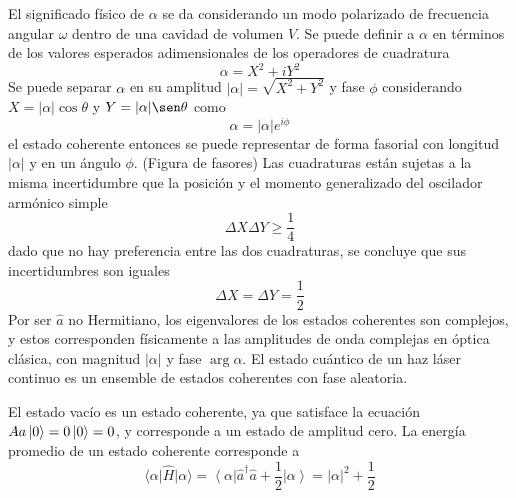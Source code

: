 El significado físico de $\alpha$ se da considerando un modo polarizado de frecuencia angular $\omega$ dentro de una cavidad de volumen $V$. Se puede definir a $\alpha$ en términos de los valores esperados adimensionales de los operadores de cuadratura
\begin{equation*}
  \alpha = X^2 + iY^2
\end{equation*}
Se puede separar $\alpha$ en su amplitud $|\alpha|=\sqrt{X^2 + Y^2}$ y fase $\phi$ considerando $X = |\alpha|\cos\theta$ y $Y=|\alpha|\sen\theta$ como
\begin{equation*}
  \alpha = |\alpha|e^{i\phi}
\end{equation*}
el estado coherente entonces se puede representar de forma fasorial con longitud $|\alpha|$ y en un ángulo $\phi$.
(Figura de fasores)
Las cuadraturas están sujetas a la misma incertidumbre que la posición y el momento generalizado del oscilador armónico simple
\begin{equation*}
  \Delta X \Delta Y \geq \frac{1}{4}
\end{equation*}
dado que no hay preferencia entre las dos cuadraturas, se concluye que sus incertidumbres son iguales
\begin{equation*}
  \Delta X = \Delta Y = \frac{1}{2}
\end{equation*}
Por ser $\hat{a}$ no Hermitiano, los eigenvalores de los estados coherentes son complejos, y estos corresponden físicamente a las amplitudes de onda complejas en óptica clásica, con magnitud $|\alpha|$ y fase $\arg \alpha$. El estado cuántico de un haz láser continuo es un ensemble de estados coherentes con fase aleatoria.

El estado vacío es un estado coherente, ya que satisface la ecuación $A{a} \ket{0} = 0 \ket{0} = 0$, y corresponde a un estado de amplitud cero. La energía promedio de un estado coherente corresponde a
\begin{equation*}
\langle \alpha \vert \hat{H}\vert \alpha \rangle = \left\langle \alpha \right\vert \hat{a}^{\dagger}\hat{a} + \frac{1}{2} \left\vert \alpha \right\rangle = |\alpha|^2 + \frac{1}{2}
\end{equation*}

